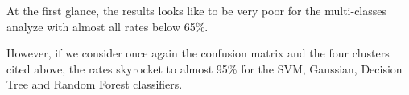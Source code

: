             
            \medskip
            
            At the first glance, the results looks like to be very poor for the multi-classes analyze with almost all 
            rates below 65\%. 
            
            \medskip
            
            However, if we consider once again the confusion matrix and the four clusters cited above, the rates skyrocket to almost 
            95\% for the SVM, Gaussian, Decision Tree and Random Forest classifiers.

            